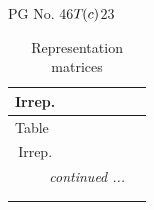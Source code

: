 \documentclass[fleqn,8pt,landscape]{jsarticle}
\begin{document}
\setcounter{MaxMatrixCols}{32}

\renewcommand{\tablename}{Table~}
\renewcommand{\figurename}{Figure~}
\begin{center}
\LARGE
PG No. 46\quad$T_{\rm }(c)$\quad$23$\quad[ cubic ]
\end{center}
\renewcommand{\arraystretch}{1.2}
\begin{longtable}{ccccccc}
\caption{Representation matrices}
 \\
 \hline \hline
Irrep. &  &  &  &  &  &  \\ \hline \endfirsthead

\multicolumn{6}{l}{\tablename\ \thetable{}} \\
 \hline \hline
Irrep. &  &  &  &  &  &  \\ \hline \endhead

 \hline \hline
\multicolumn{6}{r}{\footnotesize\it continued ...} \\ \endfoot

 \hline \hline
\multicolumn{6}{r}{} \\ \endlastfoot


\end{longtable}
\end{document}
